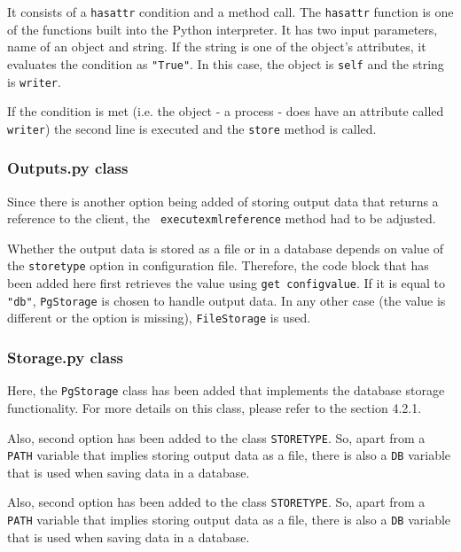 It consists of a \texttt{hasattr} condition and a method call. The
\texttt{hasattr} function is one of the functions built into the
Python interpreter. It has two input parameters, name of an object and
string. If the string is one of the object's attributes, it evaluates
the condition as \texttt{"True"}. \cite{hasattr} In this case, the
object is \texttt{self} and the string is \texttt{writer}.

If the condition is met (i.e. the object - a process - does have an
attribute called \texttt{writer}) the second line is executed and the
\texttt{store} method is called.

\subsubsection{Outputs.py class}

Since there is another option being added of storing output data that
returns a reference to the client, the \texttt{\textunderscore
  execute\textunderscore xml\textunderscore reference} method had to
be adjusted.

Whether the output data is stored as a file or in a database depends
on value of the \texttt{store\textunderscore type} option in
configuration file. Therefore, the code block that has been added here
first retrieves the value using \texttt{get\textunderscore
  config\textunderscore value}. If it is equal to \texttt{"db"},
\texttt{PgStorage} is chosen to handle output data. In any other case
(the value is different or the option is missing),
\texttt{FileStorage} is used.

\subsubsection{Storage.py class}

Here, the \texttt{PgStorage} class has been added that implements the
database storage functionality. For more details on this class, please
refer to the section 4.2.1.

Also, second option has been added to the class
\texttt{STORE\textunderscore TYPE}.  So, apart from a \texttt{PATH}
variable that implies storing output data as a file, there is also a
\texttt{DB} variable that is used when saving data in a database.

Also, second option has been added to the class
\texttt{STORE\textunderscore TYPE}. So, apart from a \texttt{PATH}
variable that implies storing output data as a file, there is also a
\texttt{DB} variable that is used when saving data in a database.


